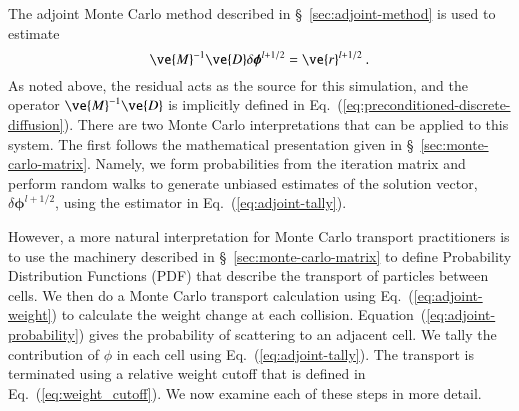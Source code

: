 \documentclass[preprint,12pt]{elsarticle}
\newcommand{\vr}{\ensuremath{\ve{r}}}
\newcommand{\bphi}{\ensuremath{\boldsymbol{\phi}}}
\begin{document}
The adjoint Monte Carlo method described in
\S~\ref{sec:adjoint-method} is used to estimate
\begin{equation}
  \ve{M}^{-1}\ve{D}\delta\bphi^{l+1/2} = \vr^{l+1/2}\:.
\end{equation}
As noted above, the residual acts as the source for this simulation,
and the operator $\ve{M}^{-1}\ve{D}$ is implicitly defined in
Eq.~(\ref{eq:preconditioned-discrete-diffusion}).  There are two Monte
Carlo interpretations that can be applied to this system.  The first
follows the mathematical presentation given in
\S~\ref{sec:monte-carlo-matrix}.  Namely, we form probabilities from
the iteration matrix and perform random walks to generate unbiased
estimates of the solution vector, $\delta\bphi^{l+1/2}$, using the
estimator in Eq.~(\ref{eq:adjoint-tally}).

However, a more natural interpretation for Monte Carlo transport
practitioners is to use the machinery described in
\S~\ref{sec:monte-carlo-matrix} to define Probability Distribution
Functions (PDF) that describe the transport of particles between
cells.  We then do a Monte Carlo transport calculation using
Eq.~(\ref{eq:adjoint-weight}) to calculate the weight change at each
collision. Equation~(\ref{eq:adjoint-probability}) gives the
probability of scattering to an adjacent cell. We tally the
contribution of $\phi$ in each cell using
Eq.~(\ref{eq:adjoint-tally}).  The transport is terminated using a
relative weight cutoff that is defined in
Eq.~(\ref{eq:weight_cutoff}).  We now examine each of these steps in
more detail.
\end{document}
